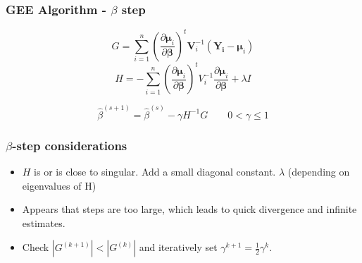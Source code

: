 \documentclass{beamer}
\begin{document}




\begin{frame}
\frametitle{GEE Algorithm - $\beta$ step}

\[G =  \sum_{i = 1}^n  \left(\frac{\partial  \boldsymbol\mu_i }{\partial \boldsymbol\beta }\right)^t\mathbf{V}_i^{-1}(\mathbf{Y_i} - \boldsymbol\mu_i)\]
\[H = - \sum_{i=1}^n \left(\frac{\partial  \boldsymbol\mu_i }{\partial \boldsymbol\beta }\right)^t V_i ^{-1} \frac{\partial  \boldsymbol\mu_i }{\partial \boldsymbol\beta } + \lambda I \]

\[\hat\beta^{(s +1)} = \hat\beta^{(s)} - \gamma H ^{-1} G \qquad 0 < \gamma \leq 1 \]


\end{frame}

\begin{frame}
\frametitle{$\beta$-step considerations}
\begin{itemize}
  \item $H$ is or is close to singular. Add a small diagonal constant. $\lambda$
  (depending on eigenvalues of H)
  \item Appears that steps are too large, which leads to quick divergence and infinite estimates.
  \item  Check $|G^{(k+1)}| < |G^{(k)}|$ and iteratively set $\gamma^{k+1} = \frac{1}{2}\gamma^k$.
\end{itemize}
\end{frame}
\end{document}
